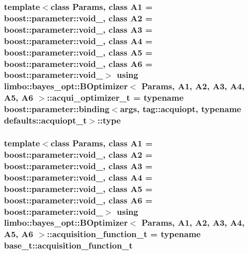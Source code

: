 \subsubsection[{acqui\+\_\+optimizer\+\_\+t}]{\setlength{\rightskip}{0pt plus 5cm}template$<$class Params, class A1 = boost\+::parameter\+::void\+\_\+, class A2 = boost\+::parameter\+::void\+\_\+, class A3 = boost\+::parameter\+::void\+\_\+, class A4 = boost\+::parameter\+::void\+\_\+, class A5 = boost\+::parameter\+::void\+\_\+, class A6 = boost\+::parameter\+::void\+\_\+$>$ using {\bf limbo\+::bayes\+\_\+opt\+::\+B\+Optimizer}$<$ Params, A1, A2, A3, A4, A5, A6 $>$\+::{\bf acqui\+\_\+optimizer\+\_\+t} =  typename boost\+::parameter\+::binding$<${\bf args}, tag\+::acquiopt, typename {\bf defaults\+::acquiopt\+\_\+t}$>$\+::type}\label{classlimbo_1_1bayes__opt_1_1_b_optimizer_a5ade62cb11aeb891ed13059d6bed28d2}
\hypertarget{classlimbo_1_1bayes__opt_1_1_b_optimizer_a1d05da5c1a8bb581fab63db1cab87cd9}{}
\subsubsection[{acquisition\+\_\+function\+\_\+t}]{\setlength{\rightskip}{0pt plus 5cm}template$<$class Params, class A1 = boost\+::parameter\+::void\+\_\+, class A2 = boost\+::parameter\+::void\+\_\+, class A3 = boost\+::parameter\+::void\+\_\+, class A4 = boost\+::parameter\+::void\+\_\+, class A5 = boost\+::parameter\+::void\+\_\+, class A6 = boost\+::parameter\+::void\+\_\+$>$ using {\bf limbo\+::bayes\+\_\+opt\+::\+B\+Optimizer}$<$ Params, A1, A2, A3, A4, A5, A6 $>$\+::{\bf acquisition\+\_\+function\+\_\+t} =  typename {\bf base\+\_\+t\+::acquisition\+\_\+function\+\_\+t}}\label{classlimbo_1_1bayes__opt_1_1_b_optimizer_a1d05da5c1a8bb581fab63db1cab87cd9}
\hypertarget{classlimbo_1_1bayes__opt_1_1_b_optimizer_a52ac13dea70e065c44b51a7ee7fef503}{}
